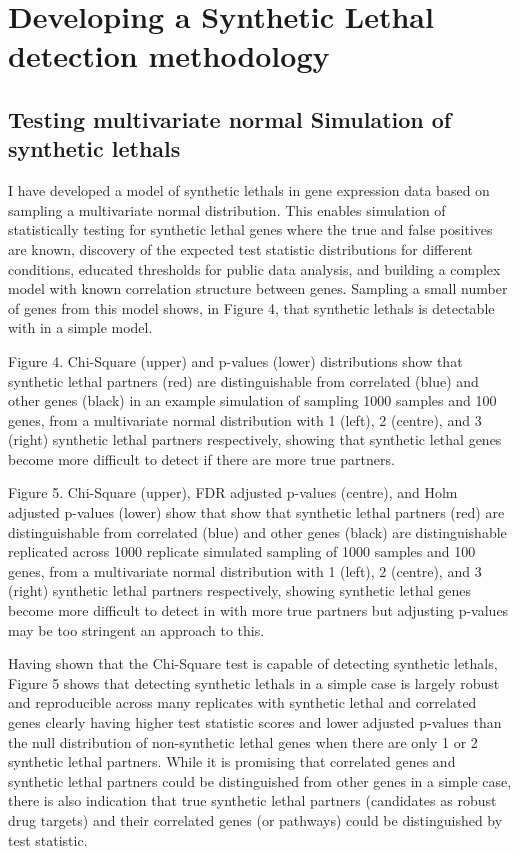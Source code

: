 \iffalse
\section{Developing a Synthetic Lethal detection methodology}

\subsection{Testing multivariate normal Simulation of \Glspl{synthetic lethal}}

I have developed a model of \glspl{synthetic lethal} in \gls{gene expression} data based on sampling a multivariate normal distribution.  This enables simulation of statistically testing for \gls{synthetic lethal} genes where the true and false positives are known, discovery of the expected test statistic distributions for different conditions, educated thresholds for public data analysis, and building a complex model with known correlation structure between genes.  Sampling a small number of genes from this model shows, in Figure 4, that \glspl{synthetic lethal} is detectable with in a simple model.

Figure 4.  Chi-Square (upper) and p-values (lower) distributions show that \gls{synthetic lethal} partners (red) are distinguishable from correlated (blue) and other genes (black) in an example simulation of sampling 1000 samples and 100 genes, from a multivariate normal distribution with 1 (left), 2 (centre), and 3 (right) \gls{synthetic lethal} partners respectively, showing that \gls{synthetic lethal} genes become more difficult to detect if there are more true partners.

Figure 5.  Chi-Square (upper), \gls{FDR} adjusted p-values (centre), and Holm adjusted p-values (lower) show that show that \gls{synthetic lethal} partners (red) are distinguishable from correlated (blue) and other genes (black) are distinguishable replicated across 1000 replicate simulated sampling of 1000 samples and 100 genes, from a multivariate normal distribution with 1 (left), 2 (centre), and 3 (right) \gls{synthetic lethal} partners respectively, showing \gls{synthetic lethal} genes become more difficult to detect in with more true partners but adjusting p-values may be too stringent an approach to this.

Having shown that the Chi-Square test is capable of detecting \glspl{synthetic lethal}, Figure 5 shows that detecting \glspl{synthetic lethal} in a simple case is largely robust and reproducible across many replicates with \gls{synthetic lethal} and correlated genes clearly having higher test statistic scores and lower adjusted p-values than the null distribution of non-synthetic lethal genes when there are only 1 or 2 \gls{synthetic lethal} partners.  While it is promising that correlated genes and \gls{synthetic lethal} partners could be distinguished from other genes in a simple case, there is also indication that true \gls{synthetic lethal} partners (candidates as robust drug targets) and their correlated genes (or pathways) could be distinguished by test statistic.

